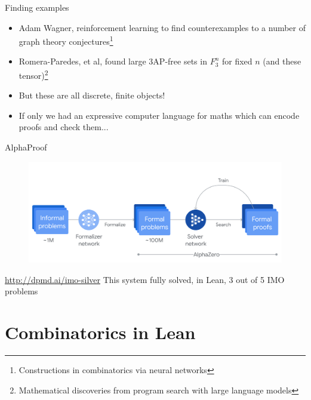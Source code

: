 \documentclass[usenames,dvipsnames,handout]{beamer}
\begin{document}
\begin{frame}{Finding examples}
  \begin{itemize}[<+->]
    \item Adam Wagner, reinforcement learning to find counterexamples to a number of graph theory conjectures\footnote{Constructions in combinatorics via neural networks}
    \item Romera-Paredes, et al, found large 3AP-free sets in $F_{3}^n$ for fixed $n$ (and these tensor)\footnote{Mathematical discoveries from program search with large language models}
    \vspace{3mm}
    \item But these are all discrete, finite objects!
    \item If only we had an expressive computer language for maths which can encode proofs and check them...
  \end{itemize}
\end{frame}
\begin{frame}{AlphaProof}
  \begin{figure}
    \centering
    \includegraphics[width=\textwidth]{alphaproof.png}
  \end{figure}
  \url{http://dpmd.ai/imo-silver}
  This system fully solved, in Lean, 3 out of 5 IMO problems
\end{frame}
\section{Combinatorics in Lean}
\end{document}

